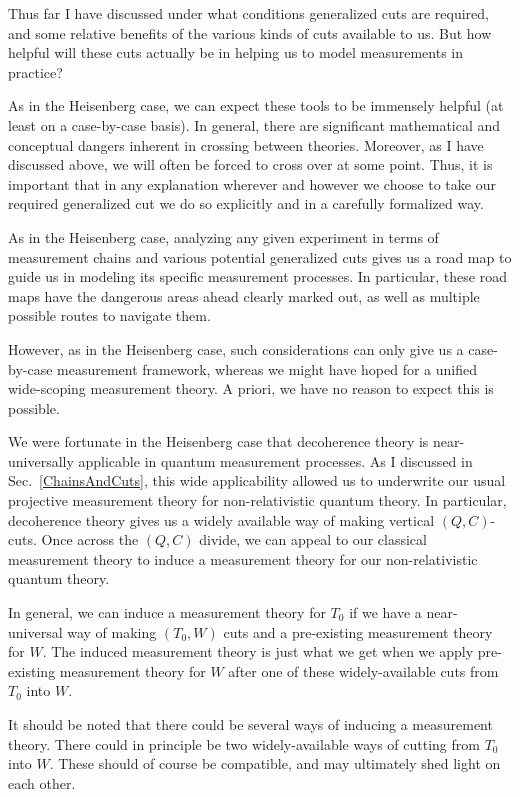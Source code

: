 \documentclass[12pt,prd,superscriptaddress,floatfix,amsmath,amssymb,amsfonts,nofootinbib]{revtex4-2}
\begin{document}
Thus far I have discussed under what conditions generalized cuts are required, and some relative benefits of the various kinds of cuts available to us. But how helpful will these cuts actually be in helping us to model measurements in practice? 

As in the Heisenberg case, we can expect these tools to be immensely helpful (at least on a case-by-case basis). In general, there are significant mathematical and conceptual dangers inherent in crossing between theories. Moreover, as I have discussed above, we will often be forced to cross over at some point. Thus, it is important that in any explanation wherever and however we choose to take our required generalized cut we do so explicitly and in a carefully formalized way.

As in the Heisenberg case, analyzing any given experiment in terms of measurement chains and various potential generalized cuts gives us a road map to guide us in modeling its specific measurement processes. In particular, these road maps have the dangerous areas ahead clearly marked out, as well as multiple possible routes to navigate them.

However, as in the Heisenberg case, such considerations can only give us a case-by-case measurement framework, whereas we might have hoped for a unified wide-scoping measurement theory. A priori, we have no reason to expect this is possible. 

We were fortunate in the Heisenberg case that decoherence theory is near-universally applicable in quantum measurement processes. As I discussed in Sec.~\ref{ChainsAndCuts}, this wide applicability allowed us to underwrite our usual projective measurement theory for non-relativistic quantum theory. In particular, decoherence theory gives us a widely available way of making vertical $(Q,C)$-cuts. Once across the $(Q,C)$ divide, we can appeal to our classical measurement theory to induce a measurement theory for our non-relativistic quantum theory. 

In general, we can induce a measurement theory for $T_0$ if we have a near-universal  way of making $(T_0,W)$ cuts and a pre-existing measurement theory for $W$. The induced measurement theory is just what we get when we apply pre-existing measurement theory for $W$ after one of these widely-available cuts from $T_0$ into $W$.

It should be noted that there could be several ways of inducing a measurement theory. There could in principle be two widely-available ways of cutting from $T_0$ into $W$. These should of course be compatible, and may ultimately shed light on each other. 
\end{document}
